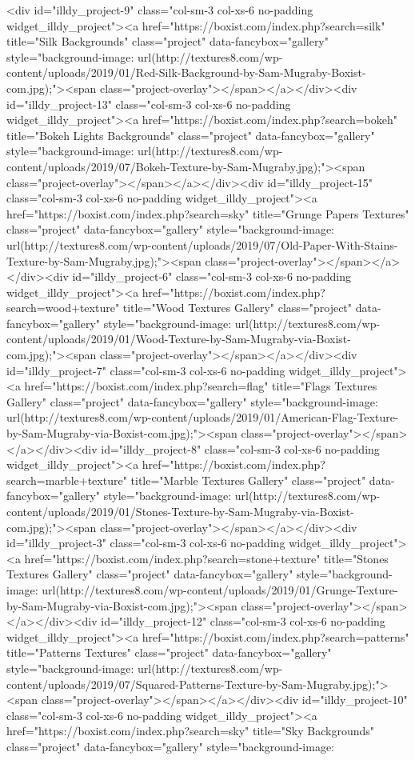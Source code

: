 				<div id="illdy_project-9" class="col-sm-3 col-xs-6 no-padding widget_illdy_project"><a href="https://boxist.com/index.php?search=silk" title="Silk Backgrounds" class="project" data-fancybox="gallery" style="background-image: url(http://textures8.com/wp-content/uploads/2019/01/Red-Silk-Background-by-Sam-Mugraby-Boxist-com.jpg);"><span class="project-overlay"></span></a></div><div id="illdy_project-13" class="col-sm-3 col-xs-6 no-padding widget_illdy_project"><a href="https://boxist.com/index.php?search=bokeh" title="Bokeh Lights Backgrounds" class="project" data-fancybox="gallery" style="background-image: url(http://textures8.com/wp-content/uploads/2019/07/Bokeh-Texture-by-Sam-Mugraby.jpg);"><span class="project-overlay"></span></a></div><div id="illdy_project-15" class="col-sm-3 col-xs-6 no-padding widget_illdy_project"><a href="https://boxist.com/index.php?search=sky" title="Grunge Papers Textures" class="project" data-fancybox="gallery" style="background-image: url(http://textures8.com/wp-content/uploads/2019/07/Old-Paper-With-Stains-Texture-by-Sam-Mugraby.jpg);"><span class="project-overlay"></span></a></div><div id="illdy_project-6" class="col-sm-3 col-xs-6 no-padding widget_illdy_project"><a href="https://boxist.com/index.php?search=wood+texture" title="Wood Textures Gallery" class="project" data-fancybox="gallery" style="background-image: url(http://textures8.com/wp-content/uploads/2019/01/Wood-Texture-by-Sam-Mugraby-via-Boxist-com.jpg);"><span class="project-overlay"></span></a></div><div id="illdy_project-7" class="col-sm-3 col-xs-6 no-padding widget_illdy_project"><a href="https://boxist.com/index.php?search=flag" title="Flags Textures Gallery" class="project" data-fancybox="gallery" style="background-image: url(http://textures8.com/wp-content/uploads/2019/01/American-Flag-Texture-by-Sam-Mugraby-via-Boxist-com.jpg);"><span class="project-overlay"></span></a></div><div id="illdy_project-8" class="col-sm-3 col-xs-6 no-padding widget_illdy_project"><a href="https://boxist.com/index.php?search=marble+texture" title="Marble Textures Gallery" class="project" data-fancybox="gallery" style="background-image: url(http://textures8.com/wp-content/uploads/2019/01/Stones-Texture-by-Sam-Mugraby-via-Boxist-com.jpg);"><span class="project-overlay"></span></a></div><div id="illdy_project-3" class="col-sm-3 col-xs-6 no-padding widget_illdy_project"><a href="https://boxist.com/index.php?search=stone+texture" title="Stones Textures Gallery" class="project" data-fancybox="gallery" style="background-image: url(http://textures8.com/wp-content/uploads/2019/01/Grunge-Texture-by-Sam-Mugraby-via-Boxist-com.jpg);"><span class="project-overlay"></span></a></div><div id="illdy_project-12" class="col-sm-3 col-xs-6 no-padding widget_illdy_project"><a href="https://boxist.com/index.php?search=patterns" title="Patterns Textures" class="project" data-fancybox="gallery" style="background-image: url(http://textures8.com/wp-content/uploads/2019/07/Squared-Patterns-Texture-by-Sam-Mugraby.jpg);"><span class="project-overlay"></span></a></div><div id="illdy_project-10" class="col-sm-3 col-xs-6 no-padding widget_illdy_project"><a href="https://boxist.com/index.php?search=sky" title="Sky Backgrounds" class="project" data-fancybox="gallery" style="background-image: 